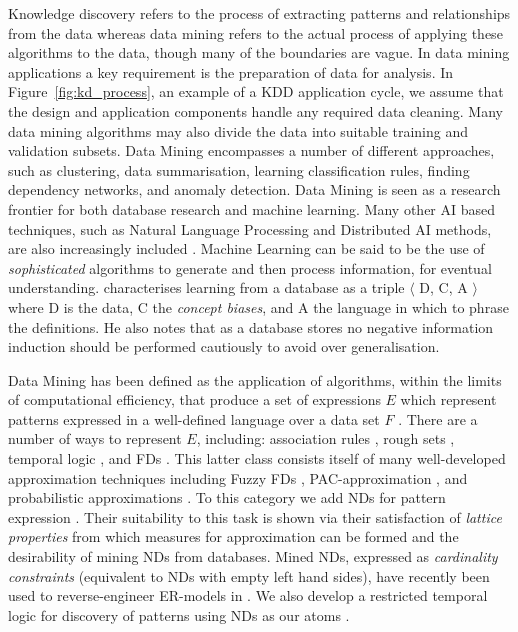 Knowledge
discovery refers to the process of extracting patterns and relationships 
from the data whereas data mining refers to the actual process of applying
these algorithms to the data, though many of the boundaries are vague.
In data mining applications a key requirement is 
the preparation of data for analysis. In Figure~\ref{fig:kd_process},
an example of a KDD application cycle, we assume that the
design and application components handle any required data
cleaning. Many data mining algorithms may also divide the data into
suitable training and validation subsets.   
Data Mining encompasses a number of different
approaches, such as clustering, data summarisation, learning
classification rules, finding dependency networks, 
and anomaly detection.  Data Mining is seen as a research frontier
for both database research and machine learning. Many other AI based techniques, such as Natural Language 
Processing and Distributed AI methods, are also increasingly included
\cite{kdd96}.  Machine Learning can be said to be the use of {\em
sophisticated} algorithms to generate and then process information,
for eventual understanding. \cite{xiao95} characterises learning from a
database as a triple $\langle$ D, C, A $\rangle$ where 
D is the data, C the {\em concept biases}, and A the language in which to
phrase the definitions. He also notes that as a database stores no  
negative information induction should be performed cautiously to avoid
over generalisation.
\medskip

Data Mining has been defined as the application of algorithms, within
the limits of computational efficiency, that produce a set of
expressions $E$ which represent patterns expressed in a well-defined
language over a data set $F$ \cite{kdd96}. There are a number of ways to
represent $E$, including: association rules \cite{ais93,toi96b}, rough
sets \cite{ziar91,incunc93}, temporal logic \cite{pt96,bt98}, and
FDs \cite{km95}. This 
latter class consists itself of many well-developed approximation
techniques including Fuzzy FDs \cite{bdp94}, PAC-approximation
\cite{at94,km95}, and probabilistic approximations
\cite{psm93,pk95,hkp98}. To this category we add NDs for pattern
expression \cite{cl98}. Their suitability to this task is shown via
their satisfaction of {\em lattice properties} from which measures for
approximation can be formed and the desirability of
mining NDs from databases. Mined NDs, expressed as {\em cardinality
constraints} (equivalent to NDs with empty left hand sides), have
recently been used to
reverse-engineer ER-models in \cite{sou98}. We also develop a
restricted temporal logic for discovery of patterns using NDs as our
atoms \cite{cl98f}.

